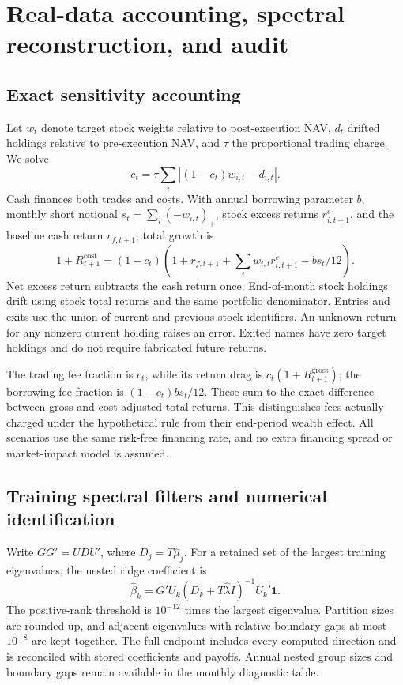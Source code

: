 \clearpage
\section{Real-data accounting, spectral reconstruction, and audit}
\label{app:real_audit}

\subsection{Exact sensitivity accounting}
Let $w_t$ denote target stock weights relative to post-execution NAV, $d_t$ drifted holdings relative to pre-execution NAV, and $\tau$ the proportional trading charge. We solve
\begin{equation}
 c_t=\tau\sum_i\left|(1-c_t)w_{i,t}-d_{i,t}\right|.
\end{equation}
Cash finances both trades and costs. With annual borrowing parameter $b$, monthly short notional $s_t=\sum_i(-w_{i,t})_+$, stock excess returns $r^e_{i,t+1}$, and the baseline cash return $r_{f,t+1}$, total growth is
\begin{equation}
 1+R^{\mathrm{cost}}_{t+1}=(1-c_t)
 \left(1+r_{f,t+1}+\sum_iw_{i,t}r^e_{i,t+1}-b s_t/12\right).
\end{equation}
Net excess return subtracts the cash return once. End-of-month stock holdings drift using stock total returns and the same portfolio denominator. Entries and exits use the union of current and previous stock identifiers. An unknown return for any nonzero current holding raises an error. Exited names have zero target holdings and do not require fabricated future returns.

The trading fee fraction is $c_t$, while its return drag is $c_t(1+R^{\mathrm{gross}}_{t+1})$; the borrowing-fee fraction is $(1-c_t)b s_t/12$. These sum to the exact difference between gross and cost-adjusted total returns. This distinguishes fees actually charged under the hypothetical rule from their end-period wealth effect. All scenarios use the same risk-free financing rate, and no extra financing spread or market-impact model is assumed.

\subsection{Training spectral filters and numerical identification}
Write $GG'=U D U'$, where $D_j=T\widehat\mu_j$. For a retained set of the largest training eigenvalues, the nested ridge coefficient is
\begin{equation}
 \widehat\beta_k=G'U_k(D_k+T\widehat\lambda I)^{-1}U_k'\mathbf{1}.
\end{equation}
The positive-rank threshold is $10^{-12}$ times the largest eigenvalue. Partition sizes are rounded up, and adjacent eigenvalues with relative boundary gaps at most $10^{-8}$ are kept together. The full endpoint includes every computed direction and is reconciled with stored coefficients and payoffs. Annual nested group sizes and boundary gaps remain available in the monthly diagnostic table.

